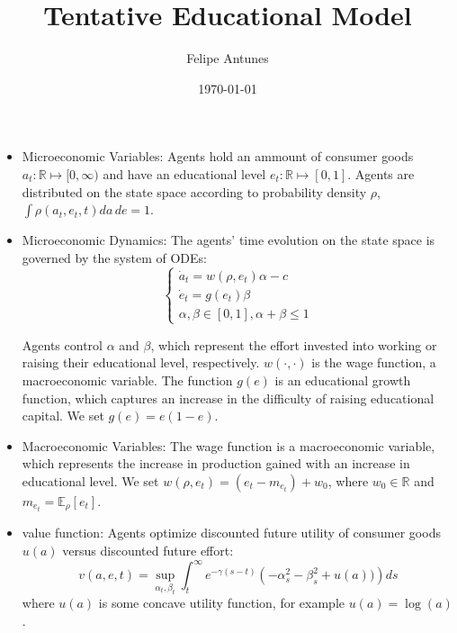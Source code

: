 \documentclass{article}
\title{Tentative Educational Model}
\author{Felipe Antunes}
\date{\today}
\begin{document}
\maketitle

\begin{itemize}
    \item Microeconomic Variables: Agents hold an ammount of consumer goods $a_t:\mathbb{R} \mapsto [0,\infty)$ and have an educational level $e_t: \mathbb{R} \mapsto [0,1]$. 
    Agents are distributed on the state space according to probability density $\rho$, $\int \rho(a_t, e_t, t) da\, de = 1$.
    \item Microeconomic Dynamics: The agents' time evolution on the state space is governed by the system of ODEs:
    \begin{equation}
        \begin{cases}
            \dot a_t = w(\rho, e_t)\alpha - c \\
            \dot e_t = g(e_t)\beta \\
            \alpha, \beta \in [0,1], \alpha + \beta \leq 1
        \end{cases}
    \end{equation}

    Agents control $\alpha$ and $\beta$, which represent the effort invested into working or raising their educational level, respectively. $w(\cdot, \cdot)$ is the wage function,
    a macroeconomic variable. The function $g(e)$ is an educational growth function, which captures an increase in the difficulty of raising educational capital. We set  
    $g(e) = e(1-e)$.
    \item Macroeconomic Variables: The wage function is a macroeconomic variable, which represents the increase in production gained with an increase in educational level.
    We set $w(\rho, e_t) = (e_t - m_{e_t}) + w_0$, where $w_0 \in \mathbb{R}$ and $m_{e_t} = \mathbb{E}_\rho [e_t]$.
    \item value function: Agents optimize discounted future utility of consumer goods $u(a)$ versus discounted future effort:
    \begin{equation}
        v(a,e,t) = \sup_{\alpha_t, \beta_t} \int_t^\infty e^{- \gamma (s - t)} \left( - \alpha_s^2 - \beta_s^2 + u(a)) \right) ds
    \end{equation}
    where $u(a)$ is some concave utility function, for example $u(a) = \log(a)$.


\end{itemize}
\end{document}
